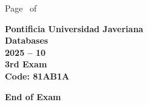 \documentclass[11pt, addpoints, answers]{exam}\usepackage[utf8]{inputenc}
\begin{document}
\begin{coverpages}
\begin{center}
			\vspace{3mm}
			\leavevmode \hspace{5mm} 
		\end{center}
	\end{coverpages}

	\footer{} {Page \thepage\ of \numpages} {}

	\centering
	\textbf{\Large Pontificia Universidad Javeriana}\\
	\textbf{\Large Databases} \\
	\textbf{\large 2025 -- 10} \\
	\textbf{\large 3rd Exam} \\
	\textbf{Code: 81AB1A}


	\begin{questions}
		
		
		
		
		
		
		
		
		
		
		
		
		
		
		
		
		
		
		
		
	\end{questions}

	\vspace{5mm}
	\noindent \textbf{End of Exam}
\end{document}
